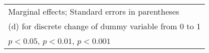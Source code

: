 {\begin{tabular}{l*{16}{c}}
\hline\hline
\multicolumn{17}{l}{\footnotesize Marginal effects; Standard errors in parentheses}\\
\multicolumn{17}{l}{\footnotesize  (d) for discrete change of dummy variable from 0 to 1}\\
\multicolumn{17}{l}{\footnotesize \sym{*} \(p<0.05\), \sym{**} \(p<0.01\), \sym{***} \(p<0.001\)}\\
\end{tabular}
}

